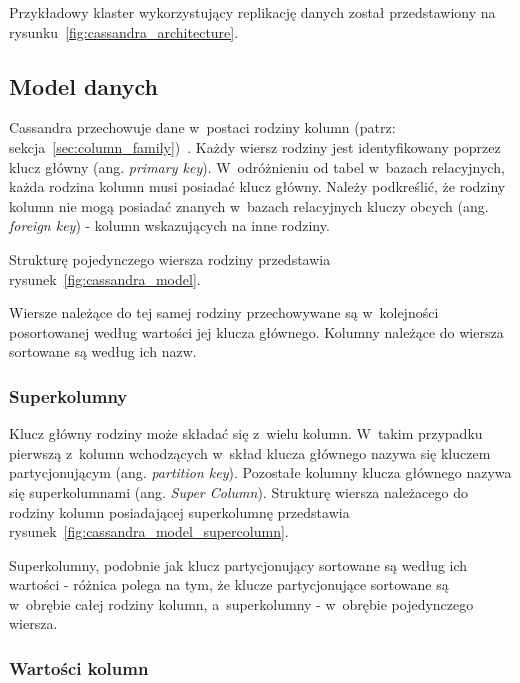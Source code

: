 Przykładowy klaster wykorzystujący replikację danych został przedstawiony na rysunku~\ref{fig:cassandra_architecture}.




\subsection{Model danych}

Cassandra przechowuje dane w~postaci rodziny kolumn (patrz: sekcja~\ref{sec:column_family})~\cite{cassandra_model}.
Każdy wiersz rodziny jest identyfikowany poprzez klucz główny (ang. \emph{primary key}).
W~odróżnieniu od tabel w~bazach relacyjnych, każda rodzina kolumn musi posiadać klucz główny.
Należy podkreślić, że rodziny kolumn nie mogą posiadać znanych w~bazach relacyjnych kluczy obcych (ang. \emph{foreign key}) - kolumn wskazujących na inne rodziny.

Strukturę pojedynczego wiersza rodziny przedstawia rysunek~\ref{fig:cassandra_model}.



Wiersze należące do tej samej rodziny przechowywane są w~kolejności posortowanej według wartości jej klucza głównego.
Kolumny należące do wiersza sortowane są według ich nazw.

\subsubsection{Superkolumny}

Klucz główny rodziny może składać się z~wielu kolumn.
W~takim przypadku pierwszą z~kolumn wchodzących w~skład klucza głównego nazywa się kluczem partycjonującym (ang. \emph{partition key}).
Pozostałe kolumny klucza głównego nazywa się superkolumnami (ang. \emph{Super Column}).
Strukturę wiersza należacego do rodziny kolumn posiadającej superkolumnę przedstawia rysunek~\ref{fig:cassandra_model_supercolumn}.



Superkolumny, podobnie jak klucz partycjonujący sortowane są według ich wartości - różnica polega na tym, że klucze partycjonujące sortowane są w~obrębie całej rodziny kolumn, a~superkolumny - w~obrębie pojedynczego wiersza.

\subsubsection{Wartości kolumn}


